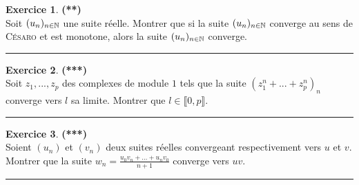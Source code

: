 \documentclass[a4paper,11pt]{article}
\theoremstyle{definition}
\newtheorem{exo}{Exercice} %
\begin{document}
\begin{minipage}{1\linewidth}
\begin{minipage}[c]{0.48\linewidth}
		\begin{exo}\textbf{(**)}\quad\\[0.2cm]
			Soit $(u_n)_{n\in\mathbb{N}}$ une suite réelle. Montrer que si la suite $(u_n)_{n\in\mathbb{N}}$ converge au sens de \textsc{Césaro} et est monotone, alors la suite $(u_n)_{n\in\mathbb{N}}$ converge.
			
			\centering
			\rule{1\linewidth}{0.6pt}
		\end{exo}
		
		\begin{exo}\textbf{(***)}\quad\\[0.2cm]
			
			Soit $z_1 ,..., z_p$ des complexes de module $1$ tels que la suite $(z_1^n +... + z _p^n )_n$ converge vers $l$ sa limite. Montrer
			que $l\in \llbracket 0, p \rrbracket$.
			
			\centering
			\rule{1\linewidth}{0.6pt}
		\end{exo}
		
	
	\begin{exo}\textbf{(***)}\quad\\[0.2cm]%
		Soient $(u_n)$ et $(v_n)$ deux suites réelles convergeant respectivement vers $u$ et $v$.
		Montrer que la suite $\displaystyle w_n=\frac{u_0v_n+\dots+u_nv_0}{n+1}$ converge vers $uv$.

		\centering
		\rule{1\linewidth}{0.6pt}
	\end{exo}
		
		
		
	\end{minipage}
\end{minipage}
\end{document}
